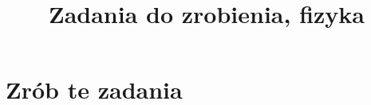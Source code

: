 \documentclass[a4paper,11pt]{article}
\title{Zadania do zrobienia, fizyka}
\begin{document}





\maketitle  %





\section{Zrób te zadania}


\end{document}
